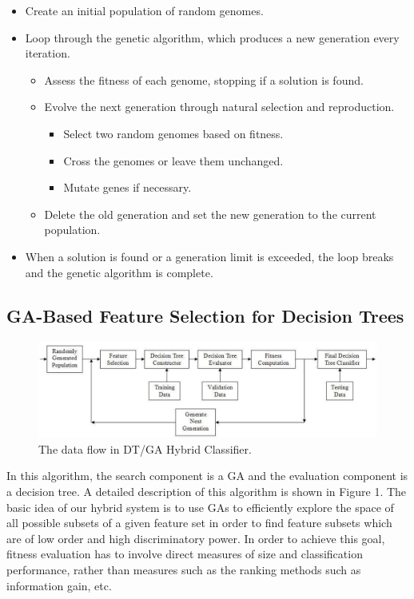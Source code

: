 \documentclass[conference]{IEEEtran}
\begin{document}
\begin{itemize}
\item{Create an initial population of random genomes.}
\item{Loop through the genetic algorithm, which produces a new generation every iteration.}

\begin{itemize}
\item{Assess the fitness of each genome, stopping if a solution is found.}
\item{Evolve the next generation through natural selection and reproduction.}

\begin{itemize}
\item{Select two random genomes based on fitness.}
\item{Cross the genomes or leave them unchanged.}
\item{Mutate genes if necessary.}
\end{itemize}
             
\item{Delete the old generation and set the new generation to the current population.}
\end{itemize}
            
\item{When a solution is found or a generation limit is exceeded, the loop breaks and the genetic algorithm is complete.}

\end{itemize} 

\subsection{GA-Based Feature Selection for Decision Trees}
\begin{figure}[h!]
  
  \centering
    \includegraphics[scale=0.25]{dfd.png}
\caption{The data flow in DT/GA Hybrid Classifier.}
\end{figure}

In this algorithm, the search component is a GA and the
evaluation component is a decision tree. A detailed description of
this algorithm is shown in Figure 1. The basic idea of our hybrid system is to use GAs to
efficiently explore the space of all possible subsets of a given
feature set in order to find feature subsets which are of low
order and high discriminatory power. In order to achieve this
goal, fitness evaluation has to involve direct
measures of size and classification performance, rather than
measures such as the ranking methods such as information gain, etc.
\end{document}
